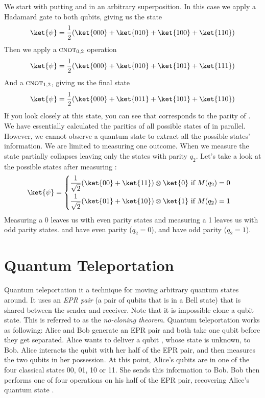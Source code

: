\documentclass[11pt, notitlepage]{report}
\begin{document}
\noindent
We start with putting  and  in an arbitrary superposition. In this case we apply a Hadamard gate to both qubits, giving us the state
\[
  \ket{\psi} = \dfrac{1}{2}(\ket{000} + \ket{010} + \ket{100} + \ket{110})
\]
Then we apply a $\textsc{cnot}_{0,2}$ operation
\[
  \ket{\psi} = \dfrac{1}{2}(\ket{000} + \ket{010} + \ket{101} + \ket{111})
\]
And a $\textsc{cnot}_{1,2}$, giving us the final state
\[
  \ket{\psi} = \dfrac{1}{2}(\ket{000} + \ket{011} + \ket{101} + \ket{110})
\]
If you look closely at this state, you can see that  corresponds to the parity of . We have essentially calculated the parities of all possible states of  in parallel. However, we cannot observe a quantum state to extract all the possible states' information. We are limited to measuring one outcome. When we measure  the state partially collapses leaving only the states with parity $q_2$. Let's take a look at the possible states after measuring :
\[
\ket{\psi} = 
\begin{cases}
\begin{aligned}
\dfrac{1}{\sqrt2}(\ket{00} + \ket{11}) \otimes \ket{0} & \text{ if } M(q_2) = 0 \\
\dfrac{1}{\sqrt2}(\ket{01} + \ket{10}) \otimes \ket{1} & \text{ if } M(q_2) = 1
\end{aligned}
\end{cases}
\]
Measuring a 0 leaves us with even parity states and measuring a 1 leaves us with odd parity states.  and  have even parity ($q_2 = 0$),  and  have odd parity ($q_2 = 1$).

\section{Quantum Teleportation}
Quantum teleportation it a technique for moving arbitrary quantum states around. It uses an \emph{EPR pair} (a pair of qubits that is in a Bell state) that is shared between the sender and receiver. Note that it is impossible clone a qubit state. This is referred to as the \emph{no-cloning theorem}. Quantum teleportation works as following: Alice and Bob generate an EPR pair and both take one qubit before they get separated. Alice wants to deliver a qubit \ket{\phi}, whose state is unknown, to Bob. Alice interacts the qubit \ket{\phi} with her half of the EPR pair, and then measures the two qubits in her possession. At this point, Alice's qubits are in one of the four classical states 00, 01, 10 or 11. She sends this information to Bob. Bob then performs one of four operations on his half of the EPR pair, recovering Alice's quantum state \ket{\phi}.
\end{document}

